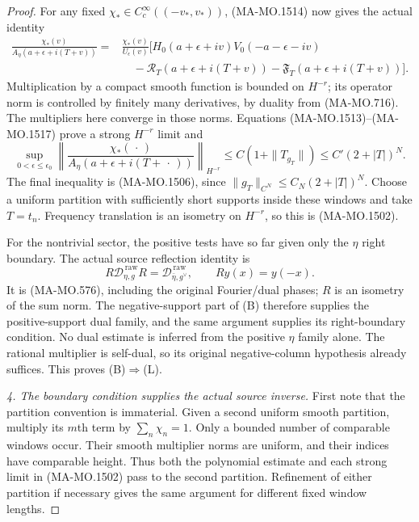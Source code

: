 \begin{proof}
For any fixed $\chi_*\in C_c^\infty((-v_*,v_*))$, (MA-MO.1514)
now gives the actual identity
\[
\begin{aligned}
 \frac{\chi_*(v)}{A_\eta(a+\epsilon+i(T+v))}
 ={}&\frac{\chi_*(v)}{U_\epsilon(v)}
  \bigl[H_0(a+\epsilon+iv)V_0(-a-\epsilon-iv)\\
 &\quad-\mathcal R_T(a+\epsilon+i(T+v))
            -\mathfrak F_T(a+\epsilon+i(T+v))\bigr].
\end{aligned}
\tag{MA-MO.1517}
\]
Multiplication by a compact smooth function
is bounded on $H^{-r}$; its operator norm is controlled by
finitely many derivatives, by duality from (MA-MO.716).
The multipliers here converge in those norms.  Equations
(MA-MO.1513)--(MA-MO.1517) prove a strong $H^{-r}$ limit and
\[
 \sup_{0<\epsilon\le\epsilon_0}
 \left\|\frac{\chi_*(\,\cdot\,)}
 {A_\eta(a+\epsilon+i(T+\,\cdot\,))}\right\|_{H^{-r}}
       \le C(1+\|T_{g_T}\|)
       \le C'(2+|T|)^N .
\tag{MA-MO.1518}
\]
The final inequality is (MA-MO.1506), since
$\|g_T\|_{C^N}\le C_N(2+|T|)^N$.
Choose a uniform partition with sufficiently short supports
inside these windows and take $T=t_n$.  Frequency translation
is an isometry on $H^{-r}$, so this is (MA-MO.1502).

For the nontrivial sector, the positive tests have so far
given only the $\eta$ right boundary.  The actual source
reflection identity is
\[
 R\mathscr D_{\eta,g}^{\,\mathrm{raw}}R
       =\mathscr D_{\bar\eta,g^\vee}^{\,\mathrm{raw}},
                         \qquad Ry(x)=y(-x).
\tag{MA-MO.1519}
\]
It is (MA-MO.576), including the original Fourier/dual phases;
$R$ is an isometry of the sum norm.  The negative-support
part of (B) therefore supplies the positive-support dual
family, and the same argument supplies its right-boundary
condition.  No dual estimate is inferred from the positive
$\eta$ family alone.  The rational multiplier is self-dual,
so its original negative-column hypothesis already suffices.
This proves (B)$\Rightarrow$(L).

\emph{4. The boundary condition supplies the actual source inverse.}
First note that the partition convention is immaterial.
Given a second uniform smooth partition, multiply its $m$th
term by $\sum_n\chi_n=1$.  Only a bounded number of comparable
windows occur.  Their smooth multiplier norms are uniform,
and their indices have comparable height.  Thus both the
polynomial estimate and each strong limit in (MA-MO.1502)
pass to the second partition.  Refinement of either partition
if necessary gives the same argument for different fixed
window lengths.


\end{proof}
